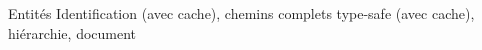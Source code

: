 
          \begin{block}{Entités}
        Identification (avec cache), chemins complets type-safe (avec cache), hiérarchie, document
          \end{block}